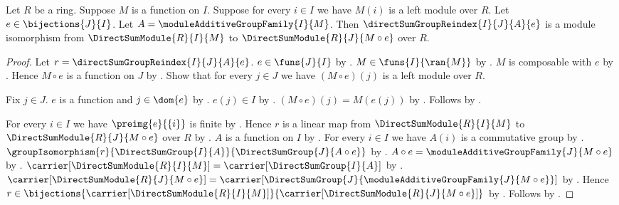 \begin{theorem}\label{bijective_direct_sum_module_reindex_isomorphism}
    Let $R$ be a ring.
    Suppose $M$ is a function on $I$.
    Suppose for every $i\in I$ we have $M(i)$ is a left module over $R$.
    Let $e\in\bijections{J}{I}$.
    Let $A=\moduleAdditiveGroupFamily{I}{M}$.
    Then $\directSumGroupReindex{I}{J}{A}{e}$ is a module isomorphism
        from $\DirectSumModule{R}{I}{M}$ to
        $\DirectSumModule{R}{J}{M\circ e}$ over $R$.
\end{theorem}
\begin{proof}
    Let $r=\directSumGroupReindex{I}{J}{A}{e}$.
    $e\in\funs{J}{I}$ by .
    $M\in\funs{I}{\ran{M}}$ by
        .
    $M$ is composable with $e$ by .
    Hence $M\circ e$ is a function on $J$ by
        .
    Show that for every $j\in J$ we have
        $(M\circ e)(j)$ is a left module over $R$.
    \begin{subproof}
        Fix $j\in J$.
        $e$ is a function and $j\in\dom{e}$ by
            .
        $e(j)\in I$ by .
        $(M\circ e)(j)=M(e(j))$ by
            .
        Follows by \auto.
    \end{subproof}
    For every $i\in I$ we have $\preimg{e}{\{i\}}$ is finite by
        .
    Hence $r$ is a linear map from $\DirectSumModule{R}{I}{M}$ to
        $\DirectSumModule{R}{J}{M\circ e}$ over $R$ by
        .
    $A$ is a function on $I$ by
        .
    For every $i\in I$ we have $A(i)$ is a commutative group by
        .
    $\groupIsomorphism{r}{\DirectSumGroup{I}{A}}{
        \DirectSumGroup{J}{A\circ e}}$ by
        .
    $A\circ e=\moduleAdditiveGroupFamily{J}{M\circ e}$ by
        .
    $\carrier[\DirectSumModule{R}{I}{M}]
        =\carrier[\DirectSumGroup{I}{A}]$ by
        .
    $\carrier[\DirectSumModule{R}{J}{M\circ e}]
        =\carrier[\DirectSumGroup{J}{
            \moduleAdditiveGroupFamily{J}{M\circ e}}]$ by
        .
    Hence $r\in\bijections{\carrier[\DirectSumModule{R}{I}{M}]}{
        \carrier[\DirectSumModule{R}{J}{M\circ e}]}$ by
        .
    Follows by .
\end{proof}

